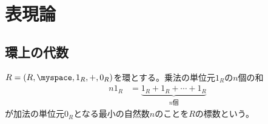 \begingroup %
	\newcommand{\lu}[2]{\ensuremath{{}^{#1}\!{#2}}}
	\newcommand{\End}{\ensuremath{\myop{End}}}
	\newcommand{\Hom}{\ensuremath{\myop{Hom}}}
	\newcommand{\Tree}{\ensuremath{\mathcal{T}}}
	\newcommand{\treeu}{\ensuremath{1_\Tree}}
	\newcommand{\Forget}{\ensuremath{\mathcal{U}}}
	\newcommand{\Word}{\ensuremath{\mathcal{W}}}
	\newcommand{\wordu}{\ensuremath{1_{\Word}}}
	\newcommand{\word}[1]{\ensuremath{[{#1}]}}
	\newcommand{\push}{\ensuremath{\myop{push}}}
	\newcommand{\pop}{\ensuremath{\myop{pop}}}
	\newcommand{\Nothing}{\ensuremath{\myop{None}}}
	\newcommand{\none}{\ensuremath{\myop{none}}}
	\newcommand{\Maybe}{\ensuremath{\myop{Maybe}}}
	\newcommand{\onto}{\ensuremath{\myop{onto}}}
	\newcommand{\im}{\ensuremath{\myop{im}}}
	\newcommand{\lin}{\ensuremath{\myop{lin}}}
	\newcommand{\map}{\ensuremath{\myop{map}}}
	\newcommand{\defeq}{\ensuremath{\overset{\mathrm{def}}{=}}}
	\newcommand{\dup}{\myop{dup}}
	\newcommand{\myid}{\myop{id}}
\section{表現論}\label{s1:表現論} %
\subsection{環上の代数}\label{s2:環上の代数} %
	\begin{definition}[環の標数]\label{def:環の標数} %
		$R=(R,\myspace,1_R,+,0_R)$を環とする。乗法の単位元$1_R$の$n$個の和
		\begin{equation*}\begin{split} %
			n1_R &= \underbrace{1_R+1_R+\cdots+1_R}_{n\text{個}}
		\end{split}\end{equation*} %
		が加法の単位元$0_R$となる最小の自然数$n$のことを$R$の標数という。
	\end{definition} %


